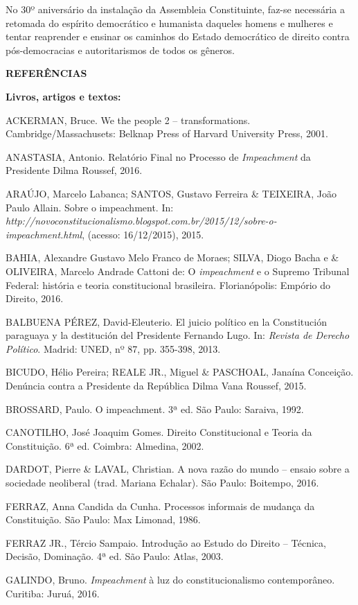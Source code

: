 No 30º aniversário da instalação da Assembleia Constituinte, faz-se
necessária a retomada do espírito democrático e humanista daqueles
homens e mulheres e tentar reaprender e ensinar os caminhos do Estado
democrático de direito contra pós-democracias e autoritarismos de todos
os gêneros.

\textbf{REFERÊNCIAS}

\textbf{Livros, artigos e textos:}

ACKERMAN, Bruce. We the people 2 -- transformations.
Cambridge/Massachusets: Belknap Press of Harvard University Press, 2001.

ANASTASIA, Antonio. Relatório Final no Processo de \emph{Impeachment} da
Presidente Dilma Roussef, 2016.

ARAÚJO, Marcelo Labanca; SANTOS, Gustavo Ferreira \& TEIXEIRA, João
Paulo Allain. Sobre o impeachment. In:
\emph{http://novoconstitucionalismo.blogspot.com.br/2015/12/sobre-o-impeachment.html},
(acesso: 16/12/2015), 2015.

BAHIA, Alexandre Gustavo Melo Franco de Moraes; SILVA, Diogo Bacha e \&
OLIVEIRA, Marcelo Andrade Cattoni de: O \emph{impeachment} e o Supremo
Tribunal Federal: história e teoria constitucional brasileira.
Florianópolis: Empório do Direito, 2016.

BALBUENA PÉREZ, David-Eleuterio. El juicio político en la Constitución
paraguaya y la destitución del Presidente Fernando Lugo. In:
\emph{Revista de Derecho Político}. Madrid: UNED, nº 87, pp. 355-398,
2013.

BICUDO, Hélio Pereira; REALE JR., Miguel \& PASCHOAL, Janaína Conceição.
Denúncia contra a Presidente da República Dilma Vana Roussef, 2015.

BROSSARD, Paulo. O impeachment. 3ª ed. São Paulo: Saraiva, 1992.

CANOTILHO, José Joaquim Gomes. Direito Constitucional e Teoria da
Constituição. 6ª ed. Coimbra: Almedina, 2002.

DARDOT, Pierre \& LAVAL, Christian. A nova razão do mundo -- ensaio
sobre a sociedade neoliberal (trad. Mariana Echalar). São Paulo:
Boitempo, 2016.

FERRAZ, Anna Candida da Cunha. Processos informais de mudança da
Constituição. São Paulo: Max Limonad, 1986.

FERRAZ JR., Tércio Sampaio. Introdução ao Estudo do Direito -- Técnica,
Decisão, Dominação. 4ª ed. São Paulo: Atlas, 2003.

GALINDO, Bruno. \emph{Impeachment} à luz do constitucionalismo
contemporâneo. Curitiba: Juruá, 2016.

